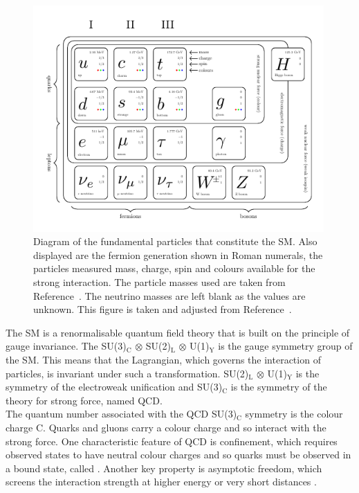 \begin{figure}[!hbtp]
\centering
    \includegraphics[width=0.99\textwidth]{Figures/SM_diagram.pdf}
\caption[Diagram of the fundamental particles in the SM.]{Diagram of the fundamental particles that constitute the SM. Also displayed are the fermion generation shown in Roman numerals, the particles measured mass, charge, spin and colours available for the strong interaction. The particle masses used are taken from Reference~\cite{ParticleDataGroup:2022pth}. The neutrino masses are left blank as the values are unknown. This figure is taken and adjusted from Reference~\cite{sm_diagram}.}
\label{fig:sm_diagram}
\end{figure}

The \ac{SM} is a renormalisable quantum field theory that is built on the principle of gauge invariance.
The SU(3)$_{\text{C}}$ $\otimes$ SU(2)$_{\text{L}}$ $\otimes$ U(1)$_{\text{Y}}$ is the gauge symmetry group of the \ac{SM}.
This means that the Lagrangian, which governs the interaction of particles, is invariant under such a transformation. 
SU(2)$_{\text{L}}$ $\otimes$ U(1)$_{\text{Y}}$ is the symmetry of the electroweak unification and SU(3)$_{\text{C}}$ is the symmetry of the theory for strong force, named \ac{QCD}. \\

The quantum number associated with the \ac{QCD} SU(3)$_\text{C}$ symmetry is the colour charge C.
Quarks and gluons carry a colour charge and so interact with the strong force.
One characteristic feature of \ac{QCD} is confinement, which requires observed states to have neutral colour charges and so quarks must be observed in a bound state, called .
Another key property is asymptotic freedom, which screens the interaction strength at higher energy or very short distances \cite{Gross:1973id,Politzer:1973fx}. \\

